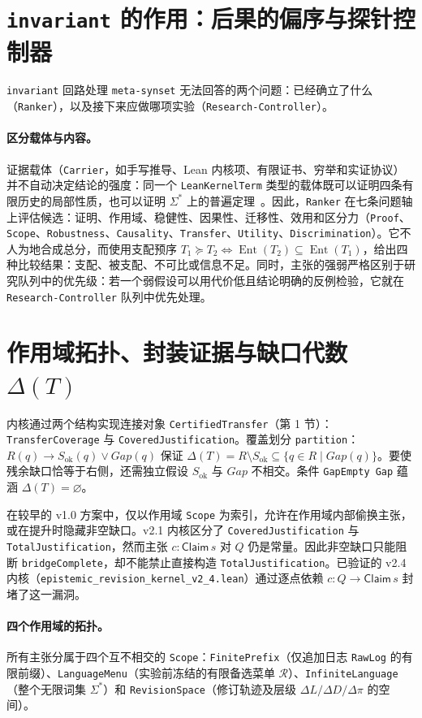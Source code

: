 \documentclass[11pt,a4paper,UTF8,fontset=fandol]{ctexart}
\DeclareRobustCommand{\id}[1]{\nolinkurl{#1}}
\newcommand{\Sok}{S_{\mathrm{ok}}}
\newcommand{\Gap}{\mathit{Gap}}
\begin{document}
\section{\texorpdfstring{\id{invariant}}{invariant} 的作用：后果的偏序与探针控制器}
\id{invariant} 回路处理 \id{meta-synset} 无法回答的两个问题：已经确立了什么（\id{Ranker}），以及接下来应做哪项实验（\id{Research-Controller}）。

\paragraph{区分载体与内容。}
证据载体（\id{Carrier}，如手写推导、Lean 内核项、有限证书、穷举和实证协议）并不自动决定结论的强度：同一个 \id{LeanKernelTerm} 类型的载体既可以证明四条有限历史的局部性质，也可以证明 $\Sigma^*$ 上的普遍定理~\cite{ms2}。因此，\id{Ranker} 在七条问题轴上评估候选：证明、作用域、稳健性、因果性、迁移性、效用和区分力（\id{Proof}、\id{Scope}、\id{Robustness}、\id{Causality}、\id{Transfer}、\id{Utility}、\id{Discrimination}）。它不人为地合成总分，而使用支配预序 $T_1\succeq T_2\Longleftrightarrow\operatorname{Ent}(T_2)\subseteq\operatorname{Ent}(T_1)$，给出四种比较结果：支配、被支配、不可比或信息不足。同时，主张的强弱严格区别于研究队列中的优先级：若一个弱假设可以用代价低且结论明确的反例检验，它就在 \id{Research-Controller} 队列中优先处理。

\section{作用域拓扑、封装证据与缺口代数 \texorpdfstring{$\Delta(T)$}{Δ(T)}}
内核通过两个结构实现连接对象 \id{CertifiedTransfer}（第 1 节）：\id{TransferCoverage} 与 \id{CoveredJustification}。覆盖划分 \id{partition}：
$R(q)\to \Sok(q)\lor \Gap(q)$ 保证 $\Delta(T)=R\setminus \Sok\subseteq\{q\in R\mid\Gap(q)\}$。要使残余缺口恰等于右侧，还需独立假设 $\Sok$ 与 $\Gap$ 不相交。条件 \id{GapEmpty Gap} 蕴涵 $\Delta(T)=\varnothing$。

在较早的 v1.0 方案中，仅以作用域 \id{Scope} 为索引，允许在作用域内部偷换主张，或在提升时隐藏非空缺口。v2.1 内核区分了 \id{CoveredJustification} 与 \id{TotalJustification}，然而主张 $c:\mathsf{Claim}\,s$ 对 $Q$ 仍是常量。因此非空缺口只能阻断 \id{bridgeComplete}，却不能禁止直接构造 \id{TotalJustification}。已验证的 v2.4 内核（\id{epistemic_revision_kernel_v2_4.lean}）通过逐点依赖 $c:Q\to\mathsf{Claim}\,s$ 封堵了这一漏洞。

\paragraph{四个作用域的拓扑。}
所有主张分属于四个互不相交的 \id{Scope}：\id{FinitePrefix}（仅追加日志 \id{RawLog} 的有限前缀）、\id{LanguageMenu}（实验前冻结的有限备选菜单 $\mathcal R$）、\id{InfiniteLanguage}（整个无限词集 $\Sigma^*$）和 \id{RevisionSpace}（修订轨迹及层级 $\Delta L/\Delta D/\Delta\pi$ 的空间）。
\end{document}
